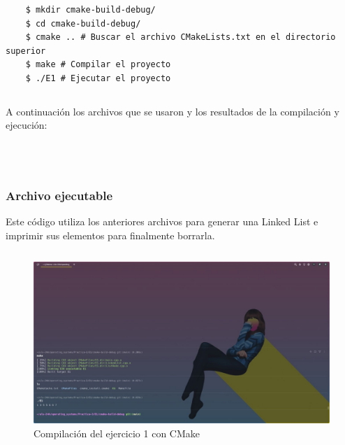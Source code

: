 \documentclass[]{article}
\newenvironment{code}{\captionsetup{type=listing}}{}
\begin{document}
\begin{verbatim}
	$ mkdir cmake-build-debug/
	$ cd cmake-build-debug/
	$ cmake .. # Buscar el archivo CMakeLists.txt en el directorio superior
	$ make # Compilar el proyecto
	$ ./E1 # Ejecutar el proyecto
\end{verbatim}

\begin{code}
	\inputminted{cmake}{../E1/CMakeLists.txt}
\end{code}

A continuación los archivos que se usaron y los resultados de la compilación y ejecución:

\begin{code}
	\inputminted{c}{../E1/LinkedList.h}
\end{code}

\begin{code}
	\inputminted{cpp}{../E1/LinkedList.cpp}
\end{code}

\begin{code}
	\inputminted{cpp}{../E1/ListNode.cpp}
\end{code}

\begin{code}
	\inputminted{c}{../E1/ListNode.h}
\end{code}

\subsubsection*{Archivo ejecutable}
Este código utiliza los anteriores archivos para generar una Linked List e imprimir sus elementos para finalmente borrarla.
\begin{code}
	\inputminted{cpp}{../E1/main.cpp}
\end{code}

\begin{figure}[h]
\caption{Compilación del ejercicio 1 con CMake}
\centering
\includegraphics[scale=0.4,trim={0 0 20cm 16cm},clip]{e1-comp.jpg}  
\end{figure}
\end{document}
